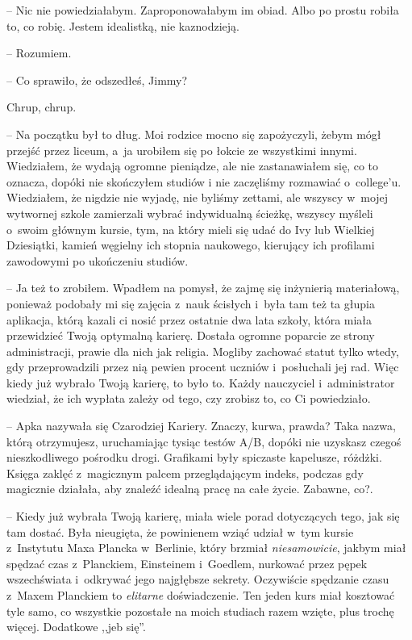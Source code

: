 \documentclass[oneside,polish,11pt,sfheadings]{mwbk}
\begin{document}
-- Nic nie powiedziałabym. Zaproponowałabym im obiad. Albo po prostu
robiła to, co robię. Jestem idealistką, nie kaznodzieją.

-- Rozumiem.

-- Co sprawiło, że odszedłeś, Jimmy?

Chrup, chrup. 

-- Na początku był to dług. Moi rodzice mocno się
zapożyczyli, żebym mógł przejść przez liceum, a~ja urobiłem się po
łokcie ze wszystkimi innymi. Wiedziałem, że wydają ogromne pieniądze,
ale nie zastanawiałem się, co to oznacza, dopóki nie skończyłem studiów
i nie zaczęliśmy rozmawiać o~college'u. Wiedziałem, że nigdzie nie
wyjadę, nie byliśmy zettami, ale wszyscy w~mojej wytwornej szkole
zamierzali wybrać indywidualną ścieżkę, wszyscy myśleli o~swoim głównym
kursie, tym, na który mieli się udać do Ivy lub Wielkiej Dziesiątki,
kamień węgielny ich stopnia naukowego, kierujący ich profilami
zawodowymi po ukończeniu studiów.

-- Ja też to zrobiłem. Wpadłem na pomysł, że zajmę się inżynierią
materiałową, ponieważ podobały mi się zajęcia z~nauk ścisłych i~była tam
też ta głupia aplikacja, którą kazali ci nosić przez ostatnie dwa lata
szkoły, która miała przewidzieć Twoją optymalną karierę. Dostała ogromne
poparcie ze strony administracji, prawie dla nich jak religia. Mogliby
zachować statut tylko wtedy, gdy przeprowadzili przez nią pewien procent
uczniów i~posłuchali jej rad. Więc kiedy już wybrało Twoją karierę, to
było to. Każdy nauczyciel i~administrator wiedział, że ich wypłata
zależy od tego, czy zrobisz to, co Ci powiedziało.

-- Apka nazywała się Czarodziej Kariery. Znaczy, kurwa, prawda? Taka
nazwa, którą otrzymujesz, uruchamiając tysiąc testów A/B, dopóki nie
uzyskasz czegoś nieszkodliwego pośrodku drogi. Grafikami były spiczaste
kapelusze, różdżki. Księga zaklęć z~magicznym palcem przeglądającym
indeks, podczas gdy magicznie działała, aby znaleźć idealną pracę na
całe życie. Zabawne, co?.

-- Kiedy już wybrała Twoją karierę, miała wiele porad dotyczących tego,
jak się tam dostać. Była nieugięta, że powinienem wziąć udział w~tym
kursie z~Instytutu Maxa Plancka w~Berlinie, który brzmiał
\textit{niesamowicie}, jakbym miał spędzać czas z~Planckiem, Einsteinem i~Goedlem, nurkować przez pępek wszechświata i~odkrywać jego najgłębsze
sekrety. Oczywiście spędzanie czasu z~Maxem Planckiem to \textit{elitarne}
doświadczenie. Ten jeden kurs miał kosztować tyle samo, co wszystkie
pozostałe na moich studiach razem wzięte, plus trochę więcej. Dodatkowe
,,jeb się''.
\end{document}
